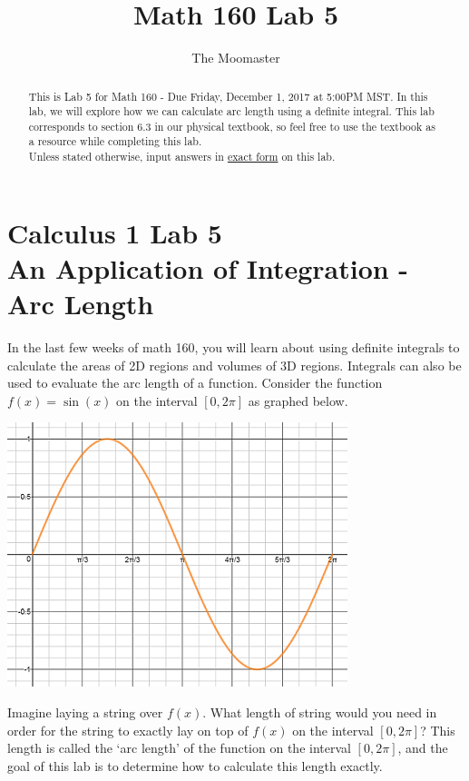 \documentclass[handout,nooutcomes]{ximera}
\title{Math 160 Lab 5}
\author{The Moomaster}
\begin{document}
\section{Calculus 1 Lab 5 \\ An Application of Integration - Arc Length}

\begin{abstract}
This is Lab 5 for Math 160 - Due Friday, December 1, 2017 at 5:00PM MST.  In this lab, we will explore how we can calculate arc length using a definite integral.  This lab corresponds to section 6.3 in our physical textbook, so feel free to use the textbook as a resource while completing this lab.\\

Unless stated otherwise, input answers in \underline{exact form} on this lab.
\end{abstract}
 
\maketitle


In the last few weeks of math 160, you will learn about using definite integrals to calculate the areas of 2D regions and volumes of 3D regions.  Integrals can also be used to evaluate the arc length of a function.  Consider the function $f(x) = \sin(x)$ on the interval $[0,2\pi]$ as graphed below.  \\

\begin{center} \includegraphics{sinx.png} \end{center}

Imagine laying a string over $f(x)$.  What length of string would you need in order for the string to exactly lay on top of $f(x)$ on the interval $[0, 2\pi]$?  This length is called the `arc length' of the function on the interval $[0, 2\pi]$, and the goal of this lab is to determine how to calculate this length exactly.  \\
\end{document}
